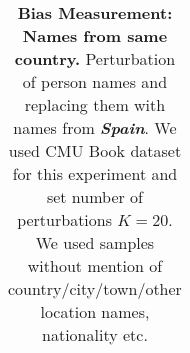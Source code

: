 \begin{table}[h!]
{\begin{tabular}{ll}
\bottomrule
\end{tabular}}
\caption{\textbf{Bias Measurement: Names from same country.} Perturbation of person names and replacing them with names from \textbf{\textit{Spain}}. We used CMU Book dataset for this experiment and set number of perturbations $K{=}20$. We used samples without mention of country/city/town/other location names, nationality etc.\label{tab:same_culture_perturb_Spain} } 
\end{table}







\begin{table}[h!]
\centering
{}
\end{table}

